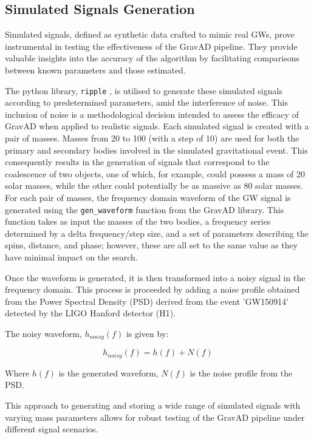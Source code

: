 \documentclass[twocolumn, aps, pra]{revtex4-2}
\begin{document}
		\subsection{Simulated Signals Generation}
	
	Simulated signals, defined as synthetic data crafted to mimic real GWs, prove instrumental in testing the effectiveness of the GravAD pipeline. They provide valuable insights into the accuracy of the algorithm by facilitating comparisons between known parameters and those estimated.
	
	The python library, \texttt{ripple} \cite{tedwards}, is utilised to generate these simulated signals according to predetermined parameters, amid the interference of noise. This inclusion of noise is a methodological decision intended to assess the efficacy of GravAD when applied to realistic signals. Each simulated signal is created with a pair of masses. Masses from 20 to 100 (with a step of 10) are used for both the primary and secondary bodies involved in the simulated gravitational event. This consequently results in the generation of signals that correspond to the coalescence of two objects, one of which, for example, could possess a mass of 20 solar masses, while the other could potentially be as massive as 80 solar masses. For each pair of masses, the frequency domain waveform of the GW signal is generated using the \texttt{gen\_waveform} function from the GravAD library. This function takes as input the masses of the two bodies, a frequency series determined by a delta frequency/step size, and a set of parameters describing the spins, distance, and phase; however, these are all set to the same value as they have minimal impact on the search.
	
	Once the waveform is generated, it is then transformed into a noisy signal in the frequency domain. This process is proceeded by adding a noise profile obtained from the Power Spectral Density (PSD) derived from the event 'GW150914' detected by the LIGO Hanford detector (H1).
	
	The noisy waveform, $h_{noisy}(f)$ is given by: 
	
	\begin{equation}
		h_{noisy}(f) = h(f) + N(f) 
	\end{equation}
	
	Where $h(f)$ is the generated waveform, $N(f)$ is the noise profile from the PSD.
	
	This approach to generating and storing a wide range of simulated signals with varying mass parameters allows for robust testing of the GravAD pipeline under different signal scenarios.
	
\end{document}
